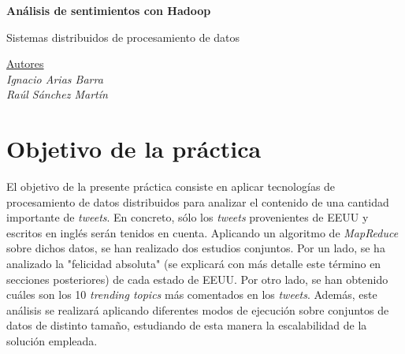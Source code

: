 \documentclass[10pt, spanish]{article}
\begin{document}
\begin{center}
\thispagestyle{empty}

\begin{Huge}
\bf{Análisis de sentimientos con Hadoop} 
\end{Huge}

\vspace{1.5cm}

\begin{LARGE}
Sistemas distribuidos de procesamiento de datos
\end{LARGE}

\vspace{2cm}

\begin{figure}[H]
\begin{center}
\end{center}
\end{figure}

\vspace{2cm}

\begin{Large}
\underline{Autores}\\
\textit{Ignacio Arias Barra}\\
\textit{Raúl Sánchez Martín}\\
\end{Large}


\end{center}

\pagebreak


\tableofcontents

\thispagestyle{empty}

\pagebreak

\clearpage
\setcounter{page}{1}

\section{Objetivo de la práctica}

El objetivo de la presente práctica consiste en aplicar tecnologías de procesamiento de datos distribuidos para analizar el contenido de una cantidad importante de \textit{tweets}. En concreto, sólo los \textit{tweets} provenientes de EEUU y escritos en inglés serán tenidos en cuenta. Aplicando un algoritmo de \textit{MapReduce} sobre dichos datos, se han realizado dos estudios conjuntos. Por un lado, se ha analizado la "felicidad absoluta" (se explicará con más detalle este término en secciones posteriores) de cada estado de EEUU. Por otro lado, se han obtenido cuáles son los 10 \textit{trending topics} más comentados en los \textit{tweets}. Además, este análisis se realizará aplicando diferentes modos de ejecución sobre conjuntos de datos de distinto tamaño, estudiando de esta manera la escalabilidad de la solución empleada.
\end{document}
